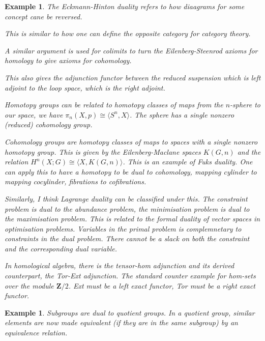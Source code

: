 \documentclass{tufte-book}
\newtheorem{example}[theorem]{Example}
\begin{document}
 \begin{example}
 	The Eckmann-Hinton duality refers to how diaagrams for some concept cane be reversed.
 
 	This is similar to how one can define the opposite category for category theory.
 
 	A similar argument is used for colimits to turn the Eilenberg-Steenrod axioms for homology to give axioms for cohomology.
 
 	This also gives the adjunction functor between the reduced suspension which is left adjoint to the loop space, which is the right adjoint.
 
 	Homotopy groups can be related to homotopy classes of maps from the $n$-sphere to our space, we have $\pi_n(X, p) \cong \langle S^n, X \rangle$. The sphere has a single nonzero (reduced) cohomology group.
 
 	Cohomology groups are homotopy classes of maps to spaces with a single nonzero homotopy group. This is given by the Eilenberg-Maclane spaces $K(G, n)$ and the relation
 	$H^n(X;G) \cong \langle X, K(G,n) \rangle$. This is an example of Fuks duality. One can apply this to have a homotopy to be dual to cohomology, mapping cylinder to mapping cocylinder, fibrations to cofibrations.
 
 	Similarly, I think Lagrange duality can be classified under this. The constraint problem is dual to the abundance problem, the minimisation problem is dual to the maximisation problem. This is related to the formal duality of vector spaces in optimisation problems. Variables in the primal problem is complemnetary to constraints in the dual problem. There cannot be a slack on both the constraint and the corresponding dual variable.
 
 	In homological algebra, there is the tensor-hom adjunction and its derived counterpart, the Tor-Ext adjunction. The standard counter example for hom-sets over the module $\mathbf{Z}/2$.
 	Ext must be a left exact functor, Tor must be a right exact functor.
 \end{example}
 
 \begin{example}
 	Subgroups are dual to quotient groups. In a quotient group, similar elements are now made equivalent (if they are in the same subgroup) by an equivalence relation.
 \end{example}
 
\end{document}
